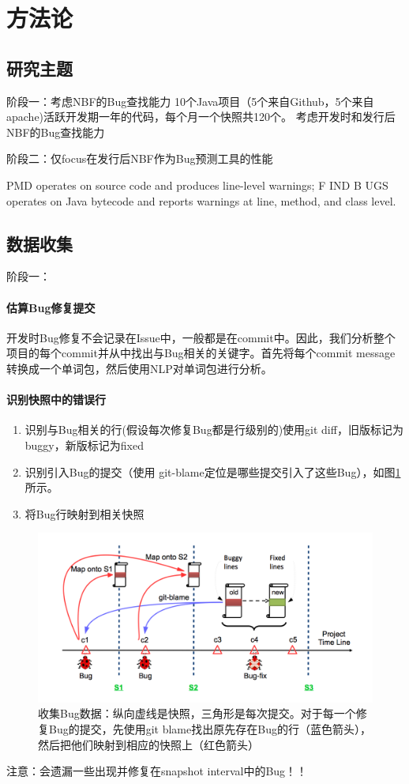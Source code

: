 \documentclass[a4paper]{article}
\begin{document}
\section{方法论}
\subsection{研究主题}
阶段一：考虑NBF的Bug查找能力
10个Java项目（5个来自Github，5个来自apache)活跃开发期一年的代码，每个月一个快照共120个。
考虑开发时和发行后NBF的Bug查找能力

阶段二：仅focus在发行后NBF作为Bug预测工具的性能

PMD operates on source code and produces line-level warnings; F IND B UGS operates on Java bytecode and reports warnings at line, method, and class level.

\subsection{数据收集}

阶段一：
\paragraph{估算Bug修复提交} 开发时Bug修复不会记录在Issue中，一般都是在commit中。因此，我们分析整个项目的每个commit并从中找出与Bug相关的关键字。首先将每个commit message转换成一个单词包，然后使用NLP对单词包进行分析。

\paragraph{识别快照中的错误行}
\begin{enumerate}
\item 识别与Bug相关的行(假设每次修复Bug都是行级别的)使用git diff，旧版标记为buggy，新版标记为fixed
\item 识别引入Bug的提交（使用 git-blame定位是哪些提交引入了这些Bug），如图\ref*{fig:data-collection}所示。
\item 将Bug行映射到相关快照
\end{enumerate}

\begin{figure}[!h]
\includegraphics[width = \linewidth]{fig/data-collection.png}
\caption{收集Bug数据：纵向虚线是快照，三角形是每次提交。对于每一个修复Bug的提交，先使用git blame找出原先存在Bug的行（蓝色箭头），然后把他们映射到相应的快照上（红色箭头）}
\label{fig:data-collection}
\end{figure}
注意：会遗漏一些出现并修复在snapshot interval中的Bug！！
\end{document}
